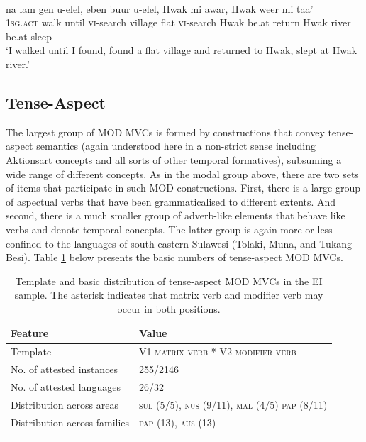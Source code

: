 \ea \label{Klon_99b}
\\
\gll na lam gen u-elel, eben buur u-elel, Hwak mi awar, Hwak weer mi taa' \\
1\textsc{sg}.\textsc{act} walk until \textsc{vi}-search village flat \textsc{vi}-search Hwak be.at return Hwak river be.at sleep \\
\glft `I walked until I found, found a flat village and returned to Hwak, slept at Hwak river.'\\ 
\z

\subsection{Tense-Aspect}

The largest group of MOD MVCs is formed by constructions that convey tense-aspect semantics (again understood here in a non-strict sense including Aktionsart concepts and all sorts of other temporal formatives), subsuming a wide range of different concepts. As in the modal group above, there are two sets of items that participate in such MOD constructions. First, there is a large group of aspectual verbs that have been grammaticalised to different extents. And second, there is a much smaller group of adverb-like elements that behave like verbs and denote temporal concepts. The latter group is again more or less confined to the languages of south-eastern Sulawesi (Tolaki, Muna, and Tukang Besi). Table \ref{table:tense-aspect} below presents the basic numbers of tense-aspect MOD MVCs.

\begin{table}
\begin{tabular}{ll}
\lsptoprule
Feature&Value\tabularnewline
\midrule
Template&V1 \textsc{matrix verb} * V2 \textsc{modifier verb}\tabularnewline
No. of attested instances& 255/2146 \tabularnewline
No. of attested languages& 26/32 \tabularnewline
Distribution across areas& \textsc{sul} (5/5), \textsc{nus} (9/11), \textsc{mal} (4/5) \textsc{pap} (8/11) \tabularnewline
Distribution across families& \textsc{pap} (13), \textsc{aus} (13) \tabularnewline
\lspbottomrule
\end{tabular}
\caption[Template and basic distribution of tense-aspect MOD MVCs]{Template and basic distribution of tense-aspect MOD MVCs in the EI sample. The asterisk indicates that matrix verb and modifier verb may occur in both positions.}
\label{table:tense-aspect}
\end{table}

